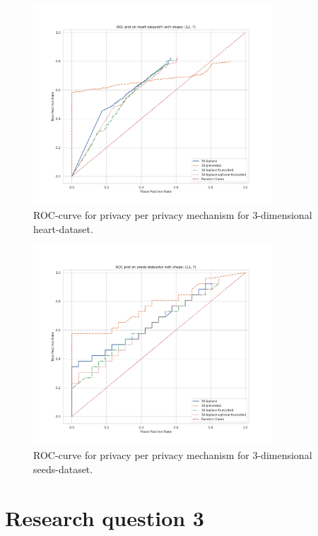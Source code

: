 \begin{figure}[H]
    \includegraphics[width=0.8\textwidth]{Results/RQ2/heart-dataset/roc_plot.png}
    \caption{ROC-curve for privacy per privacy mechanism for 3-dimensional heart-dataset.}
    \label{fig:privacy_heart-dataset_comparison_3d_roc_plot}
\end{figure}

\begin{figure}[H]
    \includegraphics[width=0.8\textwidth]{Results/RQ2/seeds-dataset/roc_plot.png}
    \caption{ROC-curve for privacy per privacy mechanism for 3-dimensional seeds-dataset.}
    \label{fig:privacy_seeds-dataset_comparison_3d_roc_plot}
\end{figure}

\section{Research question 3}